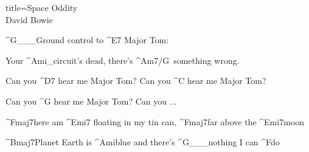 \begin{song}{title=\centering Space Oddity \\\normalsize David Bowie  \vspace*{-0.3cm}}
{	^{G{\color{white}\_\_\_}}Ground control to ^{E7\,\,}Major Tom: 

	Your ^{Ami{\color{white}\_}}circuit's dead, there's ^{Am7/G\,\,\,}something wrong.

	Can you ^{D7\,\,}hear me Major Tom? Can you ^{C\,\,}hear me Major Tom? 

	Can you ^{G\,\,}hear me Major Tom? Can you ...

	^{Fmaj7}here am ^{Emi7\,\,}floating in my tin can, ^{Fmaj7}far above the ^{Emi7}moon

	^{Bmaj7}Planet Earth is ^{Ami}blue and there's ^{G{\color{white}\_\_\_}}nothing I can ^{F}do



}
\setcounter{Slokočet}{0}
\end{song}

